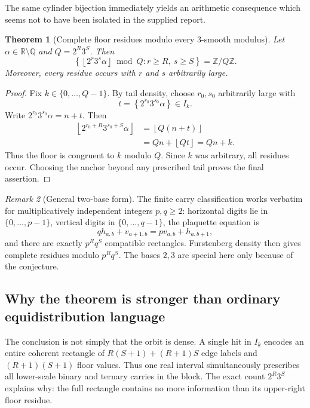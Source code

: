 \documentclass[11pt]{article}
\newtheorem{theorem}{Theorem}[section]
\theoremstyle{definition}
\theoremstyle{remark}
\newtheorem{remark}[theorem]{Remark}
\newcommand{\Z}{\mathbb Z}
\newcommand{\Q}{\mathbb Q}
\newcommand{\R}{\mathbb R}
\newcommand{\fract}[1]{\left\{#1\right\}}
\newcommand{\floor}[1]{\left\lfloor#1\right\rfloor}
\begin{document}
The same cylinder bijection immediately yields an arithmetic consequence which seems
not to have been isolated in the supplied report.

\begin{theorem}[Complete floor residues modulo every $3$-smooth modulus]
\label{thm:complete-residues}
Let $\alpha\in\R\setminus\Q$ and $Q=2^R3^S$.  Then
\begin{equation}\label{eq:complete-residue-set}
 \left\{\floor{2^r3^s\alpha}\bmod Q:r\ge R,\ s\ge S\right\}
 =\Z/Q\Z.
\end{equation}
Moreover, every residue occurs with $r$ and $s$ arbitrarily large.
\end{theorem}

\begin{proof}
Fix $k\in\{0,\ldots,Q-1\}$.  By tail density, choose $r_0,s_0$ arbitrarily large
with
\[
 t=\fract{2^{r_0}3^{s_0}\alpha}\in I_k.
\]
Write $2^{r_0}3^{s_0}\alpha=n+t$.  Then
\begin{align*}
 \floor{2^{r_0+R}3^{s_0+S}\alpha}
 &=\floor{Q(n+t)}\\
 &=Qn+\floor{Qt}=Qn+k.
\end{align*}
Thus the floor is congruent to $k$ modulo $Q$.  Since $k$ was arbitrary, all residues
occur.  Choosing the anchor beyond any prescribed tail proves the final assertion.
\end{proof}

\begin{remark}[General two-base form]
The finite carry classification works verbatim for multiplicatively independent
integers $p,q\ge2$: horizontal digits lie in $\{0,\ldots,p-1\}$, vertical digits in
$\{0,\ldots,q-1\}$, the plaquette equation is
\[
 qh_{a,b}+v_{a+1,b}=pv_{a,b}+h_{a,b+1},
\]
and there are exactly $p^Rq^S$ compatible rectangles.  Furstenberg density then gives
complete residues modulo $p^Rq^S$.  The bases $2,3$ are special here only because of
the conjecture.
\end{remark}

\subsection{Why the theorem is stronger than ordinary equidistribution language}

The conclusion is not simply that the orbit is dense.  A single hit in $I_k$
encodes an entire coherent rectangle of $R(S+1)+(R+1)S$ edge labels and
$(R+1)(S+1)$ floor values.  Thus one real interval simultaneously prescribes all
lower-scale binary and ternary carries in the block.  The exact count
$2^R3^S$ explains why: the full rectangle contains no more information than its
upper-right floor residue.
\end{document}
